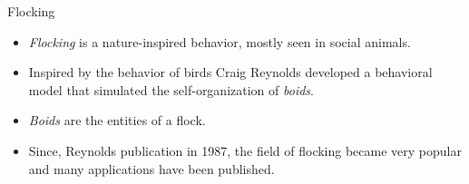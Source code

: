 \documentclass[red]{beamer}
\begin{document}
\begin{frame}{Flocking}
	\begin{itemize}
		\pause \item \textit{Flocking} is a nature-inspired behavior, mostly seen in social animals.
		\pause \item Inspired by the behavior of birds Craig Reynolds developed a behavioral model that simulated the self-organization of \textit{boids}.
		\pause \item \textit{Boids} are the entities of a flock.
		\pause \item Since, Reynolds publication in 1987, the field of flocking became very popular and many applications have been published.
	\end{itemize}
\end{frame}
\end{document}
